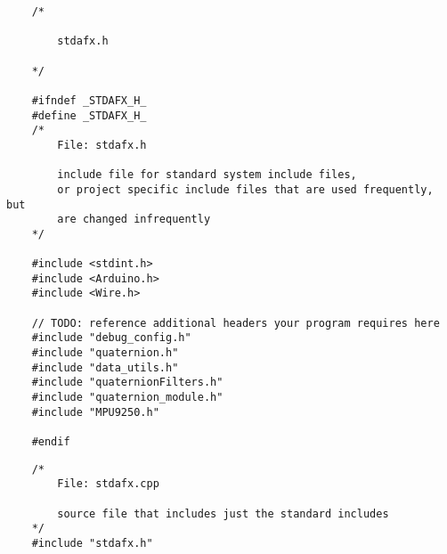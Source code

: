 	\begin{lstlisting}
	/*

		stdafx.h

	*/

	#ifndef _STDAFX_H_
	#define _STDAFX_H_
	/*
		File: stdafx.h
		
		include file for standard system include files,
		or project specific include files that are used frequently, but
		are changed infrequently
	*/

	#include <stdint.h>
	#include <Arduino.h>
	#include <Wire.h>

	// TODO: reference additional headers your program requires here
	#include "debug_config.h"
	#include "quaternion.h"
	#include "data_utils.h"
	#include "quaternionFilters.h"
	#include "quaternion_module.h"
	#include "MPU9250.h"

	#endif

	\end{lstlisting}

	\begin{lstlisting}
	/*
		File: stdafx.cpp
		
		source file that includes just the standard includes
	*/
	#include "stdafx.h"
	\end{lstlisting}
	
